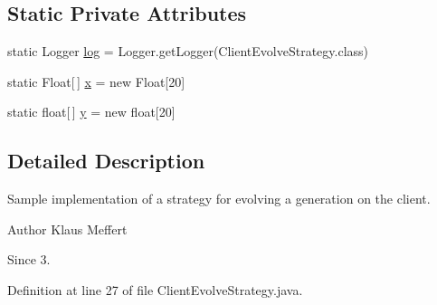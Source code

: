 \subsection*{Static Private Attributes}
\begin{DoxyCompactItemize}
\item 
static Logger \hyperlink{classexamples_1_1grid_1_1math_problem_distributed_1_1_client_evolve_strategy_ab9dbd30db73c004ae43e231238c85308}{log} = Logger.\-get\-Logger(Client\-Evolve\-Strategy.\-class)
\item 
static Float\mbox{[}$\,$\mbox{]} \hyperlink{classexamples_1_1grid_1_1math_problem_distributed_1_1_client_evolve_strategy_aac86cd006f0a8604f858b04d8a6922d8}{x} = new Float\mbox{[}20\mbox{]}
\item 
static float\mbox{[}$\,$\mbox{]} \hyperlink{classexamples_1_1grid_1_1math_problem_distributed_1_1_client_evolve_strategy_a78a08fbfc56464ac25a1578cac4acefc}{y} = new float\mbox{[}20\mbox{]}
\end{DoxyCompactItemize}


\subsection{Detailed Description}
Sample implementation of a strategy for evolving a generation on the client.

\begin{DoxyAuthor}{Author}
Klaus Meffert 
\end{DoxyAuthor}
\begin{DoxySince}{Since}
3. 
\end{DoxySince}


Definition at line 27 of file Client\-Evolve\-Strategy.\-java.



